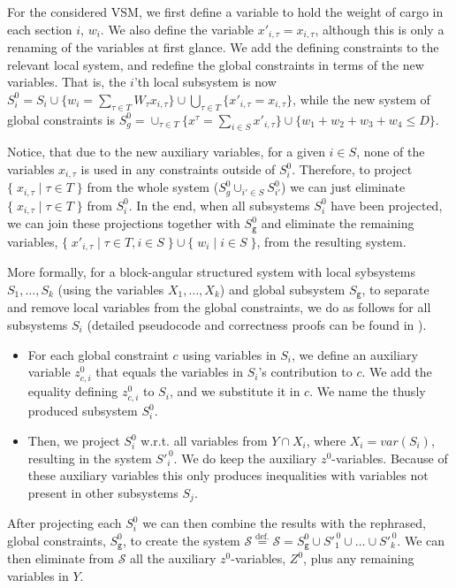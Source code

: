 \documentclass{llncs}
\newcommand{\trt}[1]{\texttt{#1}}
\newcommand{\mi}{\mathit}
\newcommand{\set}[2]{\{\;{#1}\;|\;{#2}\;\}}
\begin{document}
For the considered VSM, we first define a variable to hold the weight of cargo in each section $i$, $w_i$. We also define the variable $x'_{i,\tau} = x_{i,\tau}$, although this is only a renaming of the variables at first glance. We add the defining constraints to the relevant local system, and redefine the global constraints in terms of the new variables. 
That is, the $i$'th local subsystem is now $S_i^0 = S_i \cup \{w_i = \sum_{\tau\in T} W_\tau x_{i,\tau}\} \cup \bigcup_{\tau\in T}\{x'_{i,\tau} = x_{i,\tau}\}$, while the new system of global constraints is $S_g^0 = \cup_{\tau\in T}\{x^\tau = \sum_{i\in S} x'_{i,\tau}\} \cup \{w_1 + w_2 + w_3 + w_4 \leq D\}$. 

Notice, that due to the new auxiliary variables, for a given $i\in S$, none of the variables $x_{i,\tau}$ is used in any constraints outside of $S^0_i$. Therefore, to project $\set{x_{i,\tau}}{\tau\in T}$ from the whole system ($S^0_g\cup_{i'\in S}S^0_{i'}$) we can just eliminate $\set{x_{i,\tau}}{\tau\in T}$ from $S_i^0$. In the end, when all subsystems $S^0_i$ have been projected, we can join these projections together with $S^0_\trt{g}$ and eliminate the remaining variables, $\set{x'_{i,\tau}}{\tau\in T, i\in S}\cup\set{w_i}{i\in S}$, from the resulting system.

More formally, for a block-angular structured system with local sybsystems $S_1,\ldots, S_k$ (using the variables $X_1,\ldots, X_k$) and global subsystem $S_\texttt{g}$, to separate and remove local variables from the global constraints, we do as follows for all subsystems $S_i$ (detailed pseudocode and correctness proofs can be found in \cite{mytechrep}). 
\begin{itemize}\itemsep0em
\item For each global constraint $c$ using variables in $S_i$, we define an auxiliary variable $z^0_{c,i}$ that equals the variables in $S_i$'s contribution to $c$. We add the equality defining $z^0_{c,i}$ to $S_i$, and we substitute it in $c$. 
We name the thusly produced subsystem $S_i^0$. 
\item Then, we project $S_i^0$ w.r.t. all variables from $Y\cap X_i$, where $X_i=\mi{var}(S_i)$, resulting in the system $S'^{\,0}_i$. We do keep the auxiliary $z^0$-variables. 
Because of these auxiliary variables this only produces inequalities with variables not present in other subsystems $S_j$. 
\end{itemize}
After projecting each $S_i^0$ we can then combine the results with the rephrased, global constraints, $S_\trt{g}^0$, to create the system $\mathcal{S} \overset{\text{def.}}{=}
\mathcal{S} = S^0_\trt{g} \cup S'^{\,0}_1\cup \ldots \cup S'^{\,0}_k$.
We can then eliminate from $\mathcal{S}$ all the auxiliary $z^0$-variables, $Z^0$, plus any remaining variables in $Y$. 
\end{document}
